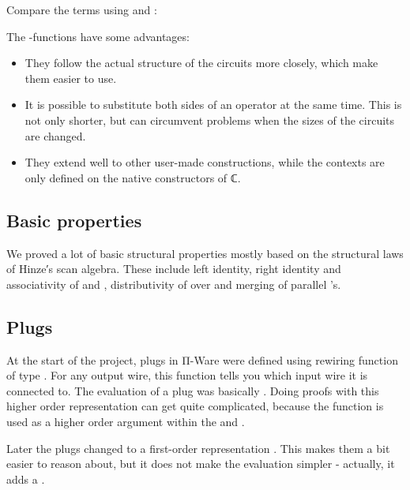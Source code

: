 Compare the terms using  and :



The -functions have some advantages:

\begin{itemize}
\item They follow the actual structure of the circuits more closely,
  which make them easier to use.
\item It is possible to substitute both sides of an operator at the
  same time.
  This is not only shorter, but can circumvent problems when the sizes
  of the circuits are changed.
\item They extend well to other user-made constructions, while the
  contexts are only defined on the native constructors of ℂ.
\end{itemize}


\subsection{Basic properties}\label{basic-properties}

We proved a lot of basic structural properties mostly based on the
structural laws of Hinze′s scan algebra.
These include left identity, right identity and associativity of
 and , distributivity of  over  and merging of
parallel 's.

\subsection{Plugs}\label{plugs}

At the start of the project, plugs in Π-Ware were defined using
rewiring function of type     .
For any output wire, this function tells you which input wire it is
connected to.
The evaluation of a plug was basically    
 \AY{=}     
\AY{(} \AY{)} \AY{)}.
Doing proofs with this higher order representation can get quite
complicated, because the function is used as a higher order argument
within the  and .

Later the plugs changed to a first-order representation 
\AY{(} \AY{)} .
This makes them a bit easier to reason about, but it does not make the
evaluation simpler - actually, it adds a .

